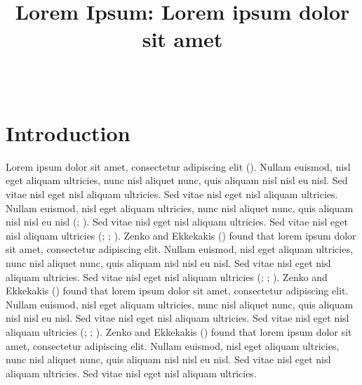 \documentclass[
  jou,
  longtable,
  nolmodern,
  notxfonts,
  notimes,
  colorlinks=true,linkcolor=blue,citecolor=blue,urlcolor=blue,
  jou]{apa7}
\title{Lorem Ipsum: Lorem ipsum dolor sit amet}
\author{~}
\affiliation{}
\begin{document}
\maketitle


\setcounter{secnumdepth}{-\maxdimen} %

\setlength\LTleft{0pt}

\resetlinenumber[1]

\section{Introduction}\label{introduction}

Lorem ipsum dolor sit amet, consectetur adipiscing elit
(). Nullam euismod,
nisl eget aliquam ultricies, nunc nisl aliquet nunc, quis aliquam nisl
nisl eu nisl. Sed vitae nisl eget nisl aliquam ultricies. Sed vitae nisl
eget nisl aliquam ultricies. Nullam euismod, nisl eget aliquam
ultricies, nunc nisl aliquet nunc, quis aliquam nisl nisl eu nisl
(; ). Sed
vitae nisl eget nisl aliquam ultricies. Sed vitae nisl eget nisl aliquam
ultricies (;
;
). Zenko and Ekkekakis
() found that lorem ipsum dolor sit amet,
consectetur adipiscing elit. Nullam euismod, nisl eget aliquam
ultricies, nunc nisl aliquet nunc, quis aliquam nisl nisl eu nisl. Sed
vitae nisl eget nisl aliquam ultricies. Sed vitae nisl eget nisl aliquam
ultricies (;
;
). Zenko and Ekkekakis
() found that lorem ipsum dolor sit amet,
consectetur adipiscing elit. Nullam euismod, nisl eget aliquam
ultricies, nunc nisl aliquet nunc, quis aliquam nisl nisl eu nisl. Sed
vitae nisl eget nisl aliquam ultricies. Sed vitae nisl eget nisl aliquam
ultricies (;
;
). Zenko and Ekkekakis
() found that lorem ipsum dolor sit amet,
consectetur adipiscing elit. Nullam euismod, nisl eget aliquam
ultricies, nunc nisl aliquet nunc, quis aliquam nisl nisl eu nisl. Sed
vitae nisl eget nisl aliquam ultricies. Sed vitae nisl eget nisl aliquam
ultricies.
\end{document}
